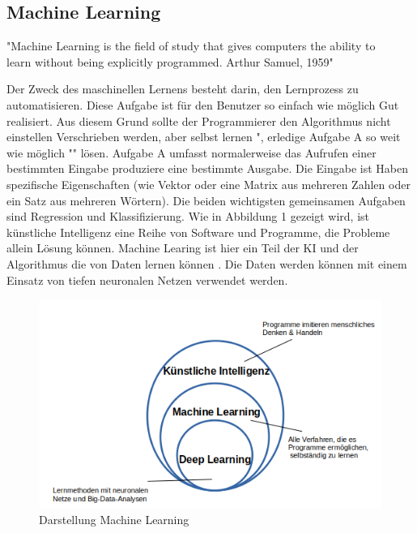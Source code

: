\documentclass[a4paper,11pt]{article}
\theoremstyle{mytheor}
\begin{document}
\subsection{Machine Learning}
\begin{center}
"Machine Learning is the field of study that gives computers the ability to \\ learn without being explicitly programmed. Arthur Samuel, 1959"
  \end{center}
  Der Zweck des maschinellen Lernens besteht darin, den Lernprozess zu automatisieren. Diese Aufgabe ist für den Benutzer so einfach wie möglich Gut realisiert. Aus diesem Grund sollte der Programmierer den Algorithmus nicht einstellen Verschrieben werden, aber selbst lernen ", erledige Aufgabe A so weit wie möglich "" lösen. Aufgabe A umfasst normalerweise das Aufrufen einer bestimmten Eingabe produziere eine bestimmte Ausgabe. Die Eingabe ist Haben spezifische Eigenschaften (wie Vektor oder eine Matrix aus mehreren Zahlen oder ein Satz aus mehreren Wörtern). Die beiden wichtigsten gemeinsamen Aufgaben sind Regression und Klassifizierung.
Wie in Abbildung 1 gezeigt wird, ist künstliche Intelligenz eine Reihe von Software und Programme, die Probleme allein Lösung können. Machine Learing ist hier ein Teil der KI und der Algorithmus die von Daten lernen können \cite{machine}.
Die Daten werden können mit einem Einsatz von tiefen neuronalen Netzen verwendet werden.
  \begin{figure}
	\includegraphics[width=1\textwidth]{MachineLearning.png}
	\caption{Darstellung Machine Learning}
	\end{figure}
\end{document}
